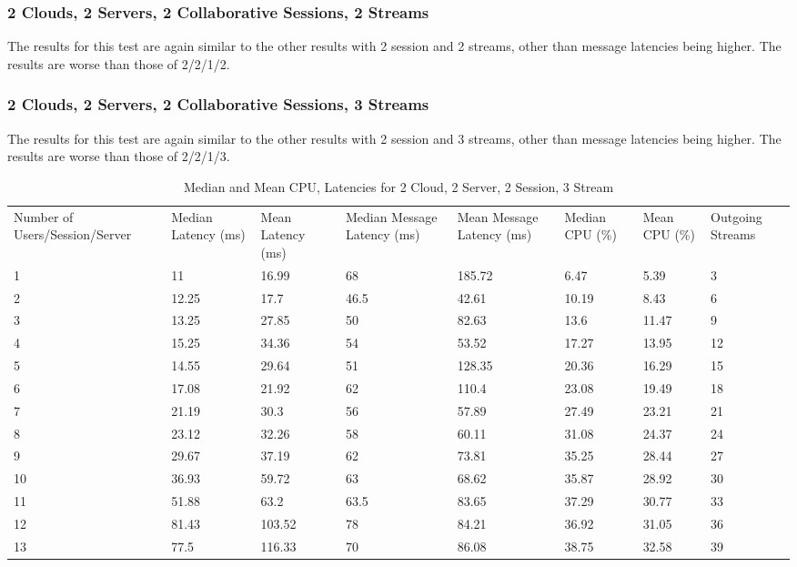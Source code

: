 \subsubsection{2 Clouds, 2 Servers, 2 Collaborative Sessions, 2 Streams}

The results for this test are again similar to the other results with 2 session and 2 streams, other than message latencies being higher. The results are worse than those of 2/2/1/2.

\subsubsection{2 Clouds, 2 Servers, 2 Collaborative Sessions, 3 Streams}

The results for this test are again similar to the other results with 2 session and 3 streams, other than message latencies being higher. The results are worse than those of 2/2/1/3.

\begin{table}
\caption{Median and Mean CPU, Latencies for 2 Cloud, 2 Server, 2 Session, 3 Stream}
\label{table:2cld_2serv_2sess_3str}
\begin{tabu} to\linewidth{|X[c]|X[c]|X[c]|X[c]|X[c]|X[c]|X[c]|X[c]|}
\everyrow{\hline}
\hline
Number of Users/Session/Server & Median Latency (ms) & Mean Latency (ms) & Median Message Latency (ms) & Mean Message Latency (ms) & Median CPU (\%) & Mean CPU (\%) & Outgoing Streams\\
1 & 11 & 16.99 & 68 & 185.72 & 6.47 & 5.39 & 3 \\
2 & 12.25 & 17.7 & 46.5 & 42.61 & 10.19 & 8.43 & 6 \\
3 & 13.25 & 27.85 & 50 & 82.63 & 13.6 & 11.47 & 9 \\
4 & 15.25 & 34.36 & 54 & 53.52 & 17.27 & 13.95 & 12 \\
5 & 14.55 & 29.64 & 51 & 128.35 & 20.36 & 16.29 & 15 \\
6 & 17.08 & 21.92 & 62 & 110.4 & 23.08 & 19.49 & 18 \\
7 & 21.19 & 30.3 & 56 & 57.89 & 27.49 & 23.21 & 21 \\
8 & 23.12 & 32.26 & 58 & 60.11 & 31.08 & 24.37 & 24 \\
9 & 29.67 & 37.19 & 62 & 73.81 & 35.25 & 28.44 & 27 \\
10 & 36.93 & 59.72 & 63 & 68.62 & 35.87 & 28.92 & 30 \\
11 & 51.88 & 63.2 & 63.5 & 83.65 & 37.29 & 30.77 & 33 \\
12 & 81.43 & 103.52 & 78 & 84.21 & 36.92 & 31.05 & 36 \\
13 & 77.5 & 116.33 & 70 & 86.08 & 38.75 & 32.58 & 39 \\
\end{tabu}
\end{table}

